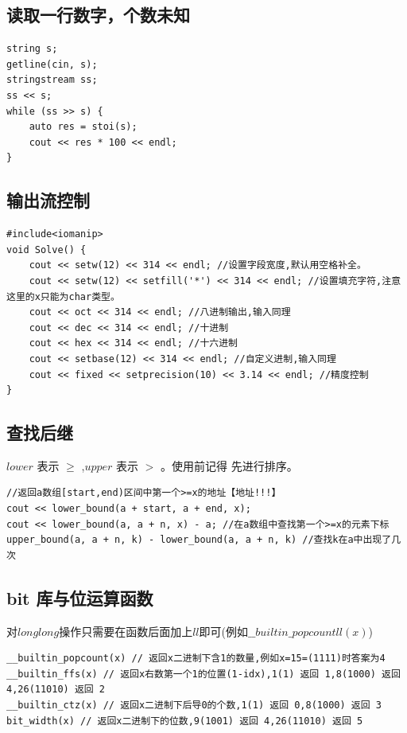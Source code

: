 \subsection{读取一行数字，个数未知}
\begin{lstlisting}[caption={}]
string s;
getline(cin, s);
stringstream ss;
ss << s;
while (ss >> s) {
    auto res = stoi(s);
    cout << res * 100 << endl;
}
\end{lstlisting}

\subsection{输出流控制}
\begin{lstlisting}[caption={}]
#include<iomanip>
void Solve() {
    cout << setw(12) << 314 << endl; //设置字段宽度,默认用空格补全。
    cout << setw(12) << setfill('*') << 314 << endl; //设置填充字符,注意这里的x只能为char类型。
    cout << oct << 314 << endl; //八进制输出,输入同理
    cout << dec << 314 << endl; //十进制
    cout << hex << 314 << endl; //十六进制
    cout << setbase(12) << 314 << endl; //自定义进制,输入同理
	cout << fixed << setprecision(10) << 3.14 << endl; //精度控制
}
\end{lstlisting}

\subsection{查找后继}
$lower$ 表示 $\ge$ ,$upper$ 表示 $>$ 。使用前记得 先进行排序。
\begin{lstlisting}[caption={}]
//返回a数组[start,end)区间中第一个>=x的地址【地址!!!】
cout << lower_bound(a + start, a + end, x);
cout << lower_bound(a, a + n, x) - a; //在a数组中查找第一个>=x的元素下标
upper_bound(a, a + n, k) - lower_bound(a, a + n, k) //查找k在a中出现了几次
\end{lstlisting}

\subsection{bit 库与位运算函数}
对$longlong$操作只需要在函数后面加上$ll$即可(例如$\_\_builtin\_popcountll(x)$)
\begin{lstlisting}[caption={}]
__builtin_popcount(x) // 返回x二进制下含1的数量,例如x=15=(1111)时答案为4
__builtin_ffs(x) // 返回x右数第一个1的位置(1-idx),1(1) 返回 1,8(1000) 返回 4,26(11010) 返回 2
__builtin_ctz(x) // 返回x二进制下后导0的个数,1(1) 返回 0,8(1000) 返回 3
bit_width(x) // 返回x二进制下的位数,9(1001) 返回 4,26(11010) 返回 5
\end{lstlisting}

